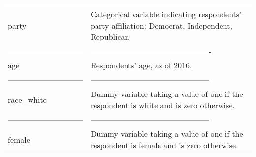 \documentclass[]{article}
\begin{document}
\begin{longtable}[]{@{}ll@{}}
\begin{minipage}[t]{0.57\columnwidth}
\end{minipage}\tabularnewline
\begin{minipage}[t]{0.37\columnwidth}\raggedright\strut
party\strut
\end{minipage} & \begin{minipage}[t]{0.57\columnwidth}\raggedright\strut
Categorical variable indicating respondents' party affiliation:
Democrat, Independent, Republican\strut
\end{minipage}\tabularnewline
\begin{minipage}[t]{0.37\columnwidth}\raggedright\strut
-----------------------------\strut
\end{minipage} & \begin{minipage}[t]{0.57\columnwidth}\raggedright\strut
----------------------------------------------\strut
\end{minipage}\tabularnewline
\begin{minipage}[t]{0.37\columnwidth}\raggedright\strut
age\strut
\end{minipage} & \begin{minipage}[t]{0.57\columnwidth}\raggedright\strut
Respondents' age, as of 2016.\strut
\end{minipage}\tabularnewline
\begin{minipage}[t]{0.37\columnwidth}\raggedright\strut
-----------------------------\strut
\end{minipage} & \begin{minipage}[t]{0.57\columnwidth}\raggedright\strut
----------------------------------------------\strut
\end{minipage}\tabularnewline
\begin{minipage}[t]{0.37\columnwidth}\raggedright\strut
race\_white\strut
\end{minipage} & \begin{minipage}[t]{0.57\columnwidth}\raggedright\strut
Dummy variable taking a value of one if the respondent is white and is
zero otherwise.\strut
\end{minipage}\tabularnewline
\begin{minipage}[t]{0.37\columnwidth}\raggedright\strut
-----------------------------\strut
\end{minipage} & \begin{minipage}[t]{0.57\columnwidth}\raggedright\strut
----------------------------------------------\strut
\end{minipage}\tabularnewline
\begin{minipage}[t]{0.37\columnwidth}\raggedright\strut
female\strut
\end{minipage} & \begin{minipage}[t]{0.57\columnwidth}\raggedright\strut
Dummy variable taking a value of one if the respondent is female and is
zero otherwise.\strut
\end{minipage}\tabularnewline
\bottomrule
\end{longtable}
\end{document}

